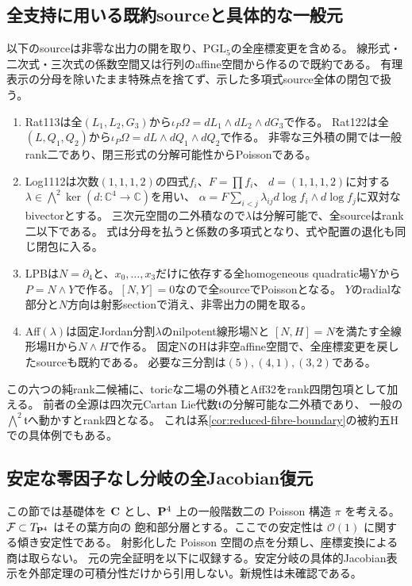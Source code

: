 \subsection{全支持に用いる既約sourceと具体的な一般元}
以下のsourceは非零な出力の開を取り、$\mathrm{PGL}_5$の全座標変更を含める。
線形式・二次式・三次式の係数空間又は行列のaffine空間から作るので既約である。
有理表示の分母を除いたまま特殊点を捨てず、示した多項式source全体の閉包で扱う。
\begin{enumerate}
\item Rat113は全$(L_1,L_2,G_3)$から$\iota_P\Omega=dL_1\wedge dL_2\wedge dG_3$で作る。
Rat122は全$(L,Q_1,Q_2)$から$\iota_P\Omega=dL\wedge dQ_1\wedge dQ_2$で作る。
非零な三外積の開では一般rank二であり、閉三形式の分解可能性からPoissonである。
\item Log1112は次数$(1,1,1,2)$の四式$f_i$、$F=\prod f_i$、
$d=(1,1,1,2)$に対する$\lambda\in\bigwedge^2\ker(d:\mathbb C^4\to\mathbb C)$を用い、
$\alpha=F\sum_{i<j}\lambda_{ij}d\log f_i\wedge d\log f_j$に双対なbivectorとする。
三次元空間の二外積なので$\lambda$は分解可能で、全sourceはrank二以下である。
式は分母を払うと係数の多項式となり、式や配置の退化も同じ閉包に入る。
\item LPBは$N=\partial_4$と、$x_0,\ldots,x_3$だけに依存する全homogeneous quadratic場Yから
$P=N\wedge Y$で作る。$[N,Y]=0$なので全sourceでPoissonとなる。
$Y$のradialな部分と$N$方向は射影sectionで消え、非零出力の開を取る。
\item Aff$(\lambda)$は固定Jordan分割$\lambda$のnilpotent線形場Nと
$[N,H]=N$を満たす全線形場Hから$N\wedge H$で作る。
固定NのHは非空affine空間で、全座標変更を戻したsourceも既約である。
必要な三分割は$(5),(4,1),(3,2)$である。
\end{enumerate}
この六つの純rank二候補に、toricな二場の外積とAff32をrank四閉包項として加える。
前者の全源は四次元Cartan Lie代数$\mathfrak t$の分解可能な二外積であり、
一般の$\bigwedge^2\mathfrak t$へ動かすとrank四となる。
これは系\ref{cor:reduced-fibre-boundary}の被約五Hでの具体例でもある。

\subsection{安定な零因子なし分岐の全Jacobian復元}
\label{sec:stable-rank-two-complete}

この節では基礎体を $\mathbf C$ とし、$\mathbf P^4$ 上の一般階数二の
Poisson 構造 $\pi$ を考える。$\mathcal F\subset T_{\mathbf P^4}$ はその葉方向の
飽和部分層とする。ここでの安定性は $\mathcal O(1)$ に関する傾き安定性である。
射影化した Poisson 空間の点を分類し、座標変換による商は取らない。
元の完全証明を以下に収録する。安定分岐の具体的Jacobian表示を外部定理の可積分性だけから引用しない。新規性は未確認である。

